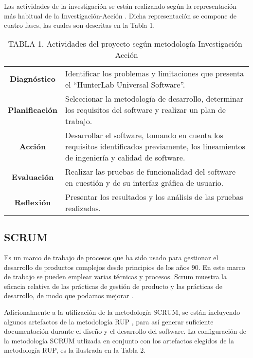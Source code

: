 \documentclass[conference]{IEEEtran}
\begin{document}
		Las actividades de la investigaci\'{o}n se est\'{a}n realizando seg\'{u}n la representaci\'{o}n m\'{a}s habitual de la Investigaci\'{o}n-Acci\'{o}n \cite{Baskerville}. Dicha representaci\'{o}n se compone de cuatro fases, las cuales son descritas en la Tabla 1.
		
		\FloatBarrier %
		\begin{table}[htb]
			\caption{TABLA 1. Actividades del proyecto seg\'{u}n metodolog\'{i}a Investigaci\'{o}n-Acci\'{o}n}
			\label{tabla_1}
			\centering
			\setlength{\extrarowheight}{2.5pt}
			\begin{tabulary}{8.8cm}{|c|J|}
				\hline
				 & \\ \hline
				\textbf{Diagn\'{o}stico} & Identificar los problemas y limitaciones que presenta el ``HunterLab Universal Software''.\\ \hline
				\textbf{Planificaci\'{o}n} & Seleccionar la metodolog\'{i}a de desarrollo, determinar los requisitos del software y realizar un plan de trabajo.
\\ \hline
				\textbf{Acci\'{o}n} & Desarrollar el software, tomando en cuenta los requisitos identificados previamente, los lineamientos de ingenier\'{i}a y calidad de software.\\ \hline
				\textbf{Evaluaci\'{o}n} & Realizar las pruebas de funcionalidad del software en cuesti\'{o}n y de su interfaz gr\'{a}fica de usuario.\\ \hline
				\textbf{Reflexi\'{o}n} & Presentar los resultados y los an\'{a}lisis de las pruebas realizadas.\\ \hline
			\end{tabulary}
		\end{table}
		\FloatBarrier %

	\subsection{SCRUM}
		Es un marco de trabajo de procesos que ha sido usado para gestionar el desarrollo de productos complejos desde principios de los a\~{n}os 90. En este marco de trabajo se pueden emplear varias t\'{e}cnicas y procesos. Scrum muestra la eficacia relativa de las pr\'{a}cticas de gesti\'{o}n de producto y las pr\'{a}cticas de desarrollo, de modo que podamos mejorar \cite{Schwaber&Sutherland}.

		Adicionalmente a la utilizaci\'{o}n de la metodolog\'{i}a SCRUM, se est\'{a}n incluyendo algunos artefactos de la metodolog\'{i}a RUP \cite{Kroll&Kruchten}, para as\'{i} generar suficiente documentaci\'{o}n durante el dise\~{n}o y el desarrollo del software. La configuraci\'{o}n de la metodolog\'{i}a SCRUM utlizada en conjunto con los artefactos elegidos de la metodolog\'{i}a RUP, es la ilustrada en la Tabla 2.
		
\end{document}
